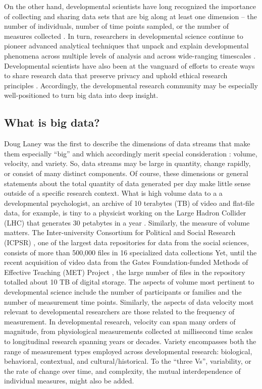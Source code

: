 \documentclass[letterpaper,man,apacite]{apa6}
\begin{document}
On the other hand, developmental scientists have long recognized the importance of collecting and sharing data sets that are big along at least one dimension -- the number of individuals, number of time points sampled, or the number of measures collected \cite{macwhinney_childes_2001}.
In turn, researchers in developmental science continue to pioneer advanced analytical techniques that unpack and explain developmental phenomena across multiple levels of analysis and across wide-ranging timescales \cite{bakeman_sequential_2011, CDS2014, QuantDev}.
Developmental scientists have also been at the vanguard of efforts to create ways to share research data that preserve privacy and uphold ethical research principles \cite{Adolph2012, AERA2011, AERAVideo2015, Asilomar2014, Databrary2015}.
Accordingly, the developmental research community may be especially well-positioned to turn big data into deep insight.

 \subsection{What is big data?}

Doug Laney \cite{laney01controlling3v} was the first to describe the dimensions of data streams that make them especially ``big'' and which accordingly merit special consideration \cite{ibm_2015}: volume, velocity, and variety.
So, data streams may be large in quantity, change rapidly, or consist of many distinct components.
Of course, these dimensions or general statements about the total quantity of data generated per day \cite{ibm_2015} make little sense outside of a specific research context.
What is high volume data to a a developmental psychologist, an archive of 10 terabytes (TB) of video and flat-file data, for example, is tiny to a physicist working on the Large Hadron Collider (LHC) that generates 30 petabytes in a year \cite{CERN_LHC}.
Similarly, the measure of volume matters.
The Inter-university Consortium for Political and Social Research (ICPSR) \cite{ICSPR}, one of the largest data repositories for data from the social sciences, consists of more than 500,000 files in 16 specialized data collections \cite{}
Yet, until the recent acquisition of video data from the Gates Foundation-funded Methods of Effective Teaching (MET) Project \cite{METProject}, the large number of files in the repository totalled about 10 TB of digital storage.
The aspects of volume most pertinent to developmental science include the number of participants or families and the number of measurement time points.
Similarly, the aspects of data velocity most relevant to developmental researchers are those related to the frequency of measurement.
In developmental research, velocity can span many orders of magnitude, from physiological measurements collected at millisecond time scales to longitudinal research spanning years or decades.
Variety encompasses both the range of measurement types employed across developmental research: biological, behavioral, contextual, and cultural/historical.
To the ``three Vs'', variability, or the rate of change over time, and complexity, the mutual interdependence of individual measures, might also be added.  
\end{document}
